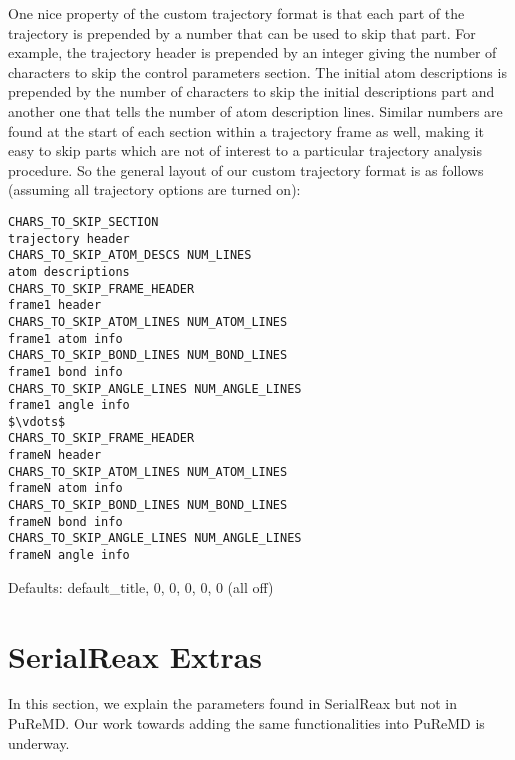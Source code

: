 \documentclass{article}
\begin{document}
One nice property of the custom trajectory format is that each part of 
the trajectory is prepended by a number that can be used to skip that part.
For example, the trajectory header is prepended by an integer giving the 
number of characters to skip the control parameters section. The initial 
atom descriptions is prepended by the number of characters to skip the 
initial descriptions part and another one that tells the number of atom 
description lines. Similar numbers are found at the start of each section 
within a trajectory frame as well, making it easy to skip parts which are 
not of interest to a particular trajectory analysis procedure. So the 
general layout of our custom trajectory format is as follows (assuming 
all trajectory options are turned on):
\begin{lstlisting}
CHARS_TO_SKIP_SECTION
trajectory header
CHARS_TO_SKIP_ATOM_DESCS NUM_LINES
atom descriptions
CHARS_TO_SKIP_FRAME_HEADER
frame1 header
CHARS_TO_SKIP_ATOM_LINES NUM_ATOM_LINES
frame1 atom info
CHARS_TO_SKIP_BOND_LINES NUM_BOND_LINES
frame1 bond info
CHARS_TO_SKIP_ANGLE_LINES NUM_ANGLE_LINES
frame1 angle info
$\vdots$
CHARS_TO_SKIP_FRAME_HEADER
frameN header
CHARS_TO_SKIP_ATOM_LINES NUM_ATOM_LINES
frameN atom info
CHARS_TO_SKIP_BOND_LINES NUM_BOND_LINES
frameN bond info
CHARS_TO_SKIP_ANGLE_LINES NUM_ANGLE_LINES
frameN angle info
\end{lstlisting}

Defaults: default\_title, 0, 0, 0, 0, 0 (all off)


\section{SerialReax Extras}
\label{sec:serialreax_extras}

In this section, we explain the parameters found in SerialReax but not in
PuReMD. Our work towards adding the same functionalities into PuReMD is 
underway.

\end{document}
